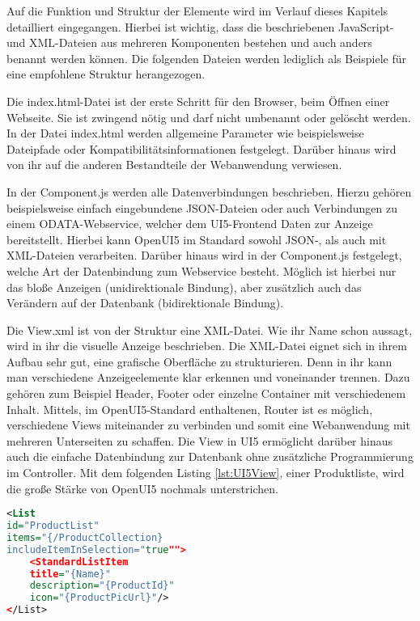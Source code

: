 Auf die Funktion und Struktur der Elemente wird im Verlauf dieses Kapitels detailliert eingegangen. Hierbei ist wichtig, dass die beschriebenen JavaScript- und XML-Dateien aus mehreren Komponenten bestehen und auch anders benannt werden können. Die folgenden Dateien werden lediglich als Beispiele für eine empfohlene Struktur herangezogen. 

Die index.html-Datei ist der erste Schritt für den Browser, beim Öffnen einer Webseite. Sie ist zwingend nötig und darf nicht umbenannt oder gelöscht werden. In der Datei index.html werden allgemeine Parameter wie beispielsweise Dateipfade oder Kompatibilitätsinformationen festgelegt. Darüber hinaus wird von ihr auf die anderen Bestandteile der Webanwendung verwiesen.

In der Component.js werden alle Datenverbindungen beschrieben. Hierzu gehören beispielsweise einfach eingebundene JSON-Dateien oder auch Verbindungen zu einem ODATA-Webservice, welcher dem UI5-Frontend Daten zur Anzeige bereitstellt. Hierbei kann OpenUI5 im Standard sowohl JSON-, als auch mit XML-Dateien verarbeiten. Darüber hinaus wird in der Component.js festgelegt, welche Art der Datenbindung zum Webservice besteht. Möglich ist hierbei nur das bloße Anzeigen (unidirektionale Bindung), aber zusätzlich auch das Verändern auf der Datenbank (bidirektionale Bindung).

Die View.xml ist von der Struktur eine XML-Datei. Wie ihr Name schon aussagt, wird in ihr die visuelle Anzeige beschrieben. Die XML-Datei eignet sich in ihrem Aufbau sehr gut, eine grafische Oberfläche zu strukturieren. Denn in ihr kann man verschiedene Anzeigeelemente klar erkennen und voneinander trennen. Dazu gehören zum Beispiel Header, Footer oder einzelne Container mit verschiedenem Inhalt. Mittels, im OpenUI5-Standard enthaltenen, Router ist es möglich, verschiedene Views miteinander zu verbinden und somit eine Webanwendung mit mehreren Unterseiten zu schaffen. Die View in UI5 ermöglicht darüber hinaus auch die einfache Datenbindung zur Datenbank ohne zusätzliche Programmierung im Controller. Mit dem folgenden Listing \ref{lst:UI5View}, einer Produktliste, wird die große Stärke von OpenUI5 nochmals unterstrichen.

\begin{lstlisting}[caption=Beispiel OpenUI5 View, label=lst:UI5View, language=XML]
<List
id="ProductList"
items="{/ProductCollection}
includeItemInSelection="true"">
	<StandardListItem
	title="{Name}"
	description="{ProductId}"
	icon="{ProductPicUrl}"/>
</List>
\end{lstlisting}

